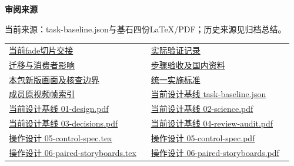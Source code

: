 \documentclass[11pt,a4paper]{article}
\newcommand{\reviewsubsection}[1]{\par\Needspace{4\baselineskip}\vspace{4pt}\begin{center}{\titlelatin\titlecjk\bfseries\fontsize{12}{18}\selectfont #1}\end{center}}
\begin{document}
\begin{minipage}{\linewidth}
\reviewsubsection{3.4 审阅来源}
当前来源：task-\allowbreak{}baseline.json与基石四份LaTeX/\allowbreak{}PDF；历史来源见归档总结。


\begingroup\small\setlength{\tabcolsep}{4pt}\begin{tabular}{@{}p{0.48\linewidth}p{0.48\linewidth}@{}}
\href{file:///D:/Agent/srp/agent/tasks/U-03/outputs/current-slice.md}{当前fade切片交接} & \href{file:///D:/Agent/srp/agent/tasks/U-03/evidence/verification.json}{实际验证记录}\\[4pt]
\href{file:///D:/Agent/srp/agent/tasks/U-03/evidence/consumer-impact.md}{迁移与消费者影响} & \href{file:///D:/Agent/srp/agent/tasks/U-03/TASK.md}{步骤验收及国内资料}\\[4pt]
\href{file:///D:/Agent/srp/agent/tasks/U-03/outputs/current-implementation-evidence.md}{本包新版画面及核查边界} & \href{file:///D:/Agent/srp/agent/design/weather/2026-10-08_Storm\%E4\%B8\%8E\%E7\%BA\%AF\%E7\%B2\%92\%E5\%AD\%90\%E5\%8F\%8C\%E7\%8E\%AF\%E5\%AE\%9E\%E6\%96\%BD\%E6\%A0\%87\%E5\%87\%86.md}{统一实施标准}\\[4pt]
\href{file:///D:/Agent/srp/human/assets/previews/2026-10-08/member-storm-particle-rings/frame-index.json}{成员原视频帧索引} & \href{file:///D:/Agent/srp/agent/design/design-foundation-20261008/task-baseline.json}{当前设计基线 task-\allowbreak{}baseline.json}\\[4pt]
\href{file:///D:/Agent/srp/agent/design/design-foundation-20261008/01-design.pdf}{当前设计基线 01-\allowbreak{}design.pdf} & \href{file:///D:/Agent/srp/agent/design/design-foundation-20261008/02-science.pdf}{当前设计基线 02-\allowbreak{}science.pdf}\\[4pt]
\href{file:///D:/Agent/srp/agent/design/design-foundation-20261008/03-decisions.pdf}{当前设计基线 03-\allowbreak{}decisions.pdf} & \href{file:///D:/Agent/srp/agent/design/design-foundation-20261008/04-review-audit.pdf}{当前设计基线 04-\allowbreak{}review-\allowbreak{}audit.pdf}\\[4pt]
\href{file:///D:/Agent/srp/agent/design/design-foundation-20261008/05-control-spec.tex}{操作设计 05-\allowbreak{}control-\allowbreak{}spec.tex} & \href{file:///D:/Agent/srp/agent/design/design-foundation-20261008/05-control-spec.pdf}{操作设计 05-\allowbreak{}control-\allowbreak{}spec.pdf}\\[4pt]
\href{file:///D:/Agent/srp/agent/design/design-foundation-20261008/06-paired-storyboards.tex}{操作设计 06-\allowbreak{}paired-\allowbreak{}storyboards.tex} & \href{file:///D:/Agent/srp/agent/design/design-foundation-20261008/06-paired-storyboards.pdf}{操作设计 06-\allowbreak{}paired-\allowbreak{}storyboards.pdf}\\[4pt]

\end{tabular}
\end{minipage}
\end{document}
